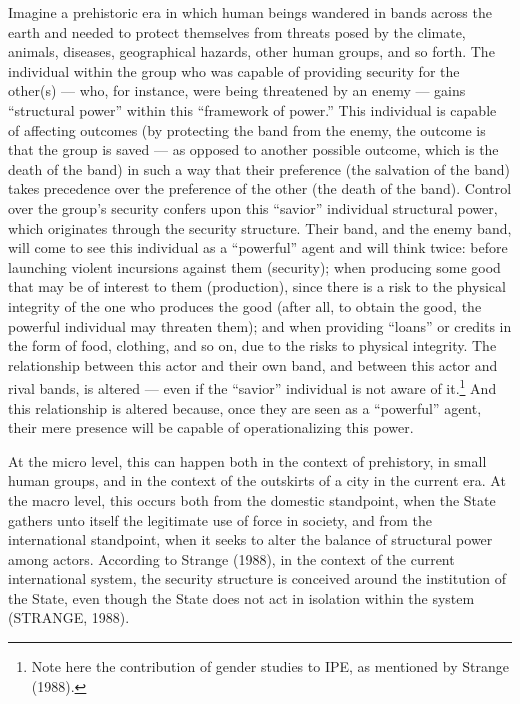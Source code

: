 Imagine a prehistoric era in which human beings wandered in bands across the earth and needed to protect themselves from threats posed by the climate, animals, diseases, geographical hazards, other human groups, and so forth. The individual within the group who was capable of providing security for the other(s) --- who, for instance, were being threatened by an enemy --- gains ``structural power'' within this ``framework of power.'' This individual is capable of affecting outcomes (by protecting the band from the enemy, the outcome is that the group is saved --- as opposed to another possible outcome, which is the death of the band) in such a way that their preference (the salvation of the band) takes precedence over the preference of the other (the death of the band). Control over the group's security confers upon this ``savior'' individual structural power, which originates through the security structure. Their band, and the enemy band, will come to see this individual as a ``powerful'' agent and will think twice: before launching violent incursions against them (security); when producing some good that may be of interest to them (production), since there is a risk to the physical integrity of the one who produces the good (after all, to obtain the good, the powerful individual may threaten them); and when providing ``loans'' or credits in the form of food, clothing, and so on, due to the risks to physical integrity. The relationship between this actor and their own band, and between this actor and rival bands, is altered --- even if the ``savior'' individual is not aware of it.\footnote{Note here the contribution of gender studies to IPE, as mentioned by Strange (1988).} And this relationship is altered because, once they are seen as a ``powerful'' agent, their mere presence will be capable of operationalizing this power.

At the micro level, this can happen both in the context of prehistory, in small human groups, and in the context of the outskirts of a city in the current era. At the macro level, this occurs both from the domestic standpoint, when the State gathers unto itself the legitimate use of force in society, and from the international standpoint, when it seeks to alter the balance of structural power among actors. According to Strange (1988), in the context of the current international system, the security structure is conceived around the institution of the State, even though the State does not act in isolation within the system (STRANGE, 1988).

